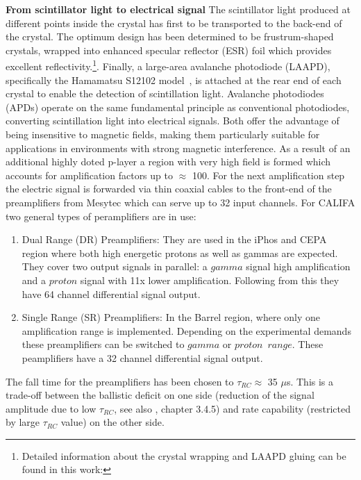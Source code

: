 \textbf{From scintillator light to electrical signal}\newline
The scintillator light produced at different points inside the crystal has first to be transported to the back-end of the crystal. The optimum design has been determined to be frustrum-shaped crystals, wrapped into enhanced specular reflector (ESR) foil which provides excellent reflectivity.\footnote{Detailed information about the crystal wrapping and LAAPD gluing can be found in this work:\cite{hartigevolution}}. Finally, a large-area avalanche photodiode (LAAPD), specifically the Hamamatsu S12102 model~\cite{hamamatsuS8664}, is attached at the rear end of each crystal to enable the detection of scintillation light. Avalanche photodiodes (APDs) operate on the same fundamental principle as conventional photodiodes, converting scintillation light into electrical signals. Both offer the advantage of being insensitive to magnetic fields, making them particularly suitable for applications in environments with strong magnetic interference. As a result of an additional highly doted p-layer a region with very high field is formed which accounts for amplification factors up to $\approx$ 100.\newline
For the next amplification step the  electric signal is forwarded via thin coaxial cables to the front-end of the preamplifiers from Mesytec\cite{mesytec-home} which can serve up to 32 input channels. For CALIFA two general types of peramplifiers are in use:
\begin{enumerate}
\item Dual Range (DR) Preamplifiers: They are used in the iPhos and CEPA region where both high energetic protons as well as gammas are expected. They cover two output signals in parallel: a $gamma$ signal high amplification and a $proton$ signal with  11x lower amplification. Following from this they have 64 channel differential signal output.
\item Single Range (SR) Preamplifiers: In the Barrel region, where only one amplification range is implemented. Depending on the experimental demands these preamplifiers can be switched to $gamma$ or $proton \enspace range$. These peamplifiers have a 32 channel differential signal output.
\end{enumerate}
The fall time for the preamplifiers has been chosen to $\tau_{RC} \approx$ 35 $\mu$s. This is a trade-off between the ballistic deficit on one side (reduction of the signal amplitude due to low $\tau_{RC}$, see also \cite{winkel2011implementierung}, chapter 3.4.5) and rate capability (restricted by large $\tau_{RC}$ value) on the other side.\newline
